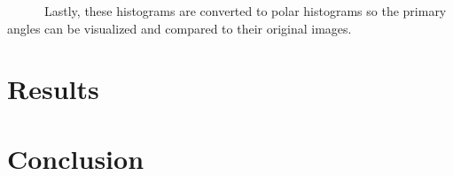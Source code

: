 \documentclass[
  letterpaper,
  DIV=11,
  numbers=noendperiod]{scrreprt}
\begin{document}
~~~~~~Lastly, these histograms are converted to polar histograms so the
primary angles can be visualized and compared to their original images.


\hypertarget{results}{%
\chapter{Results}\label{results}}


\hypertarget{conclusion}{%
\chapter{Conclusion}\label{conclusion}}
\end{document}
